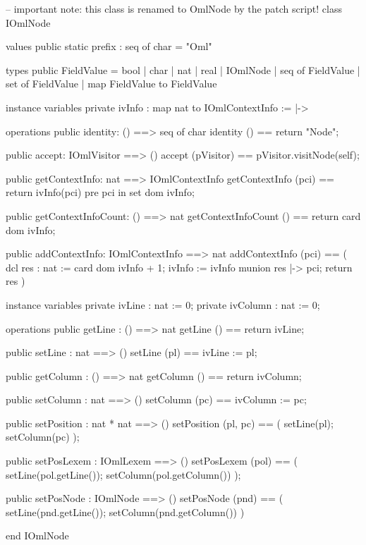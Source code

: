 \begin{vdm_al}
-- important note: this class is renamed to OmlNode by the patch script!
class IOmlNode

values
  public static prefix : seq of char = "Oml"

types
  public FieldValue = 
    bool | char | nat | real | IOmlNode | 
    seq of FieldValue |
    set of FieldValue |
    map FieldValue to FieldValue

instance variables
  private ivInfo : map nat to IOmlContextInfo := {|->}

operations
  public identity: () ==> seq of char
  identity () == return "Node";

  public accept: IOmlVisitor ==> ()
  accept (pVisitor) == pVisitor.visitNode(self);

  public getContextInfo: nat ==> IOmlContextInfo
  getContextInfo (pci) == return ivInfo(pci)
    pre pci in set dom ivInfo;

  public getContextInfoCount: () ==> nat
  getContextInfoCount () == return card dom ivInfo;

  public addContextInfo: IOmlContextInfo ==> nat
  addContextInfo (pci) ==
    ( dcl res : nat := card dom ivInfo + 1;
      ivInfo := ivInfo munion {res |-> pci};
      return res )

instance variables
  private ivLine : nat := 0;
  private ivColumn : nat := 0;

operations
  public getLine : () ==> nat
  getLine () == return ivLine;

  public setLine : nat ==> ()
  setLine (pl) == ivLine := pl;

  public getColumn : () ==> nat
  getColumn () == return ivColumn;

  public setColumn : nat ==> ()
  setColumn (pc) == ivColumn := pc;

  public setPosition : nat * nat ==> ()
  setPosition (pl, pc) ==
    ( setLine(pl); setColumn(pc) );

  public setPosLexem : IOmlLexem ==> ()
  setPosLexem (pol) ==
    ( setLine(pol.getLine());
      setColumn(pol.getColumn()) );

  public setPosNode : IOmlNode ==> ()
  setPosNode (pnd) ==
    ( setLine(pnd.getLine());
      setColumn(pnd.getColumn()) )

end IOmlNode
\end{vdm_al}

